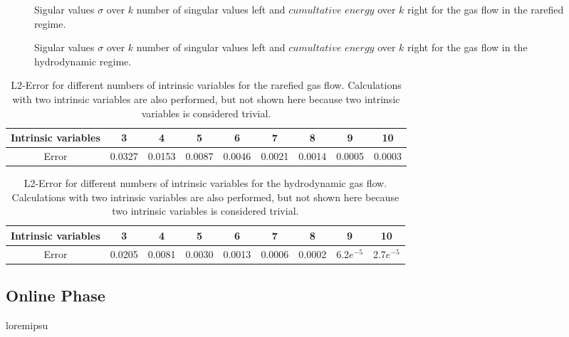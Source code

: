 \begin{figure}[!htbp]
	
	\caption{Sigular values \(\sigma\) over \(k\) number of singular values left and \(cumultative\) \(energy\) over \(k\) right for the gas flow in the rarefied regime.}
	\label{Fig:CumSum_Rare}
\end{figure}
\begin{figure}[!htbp]
	
	\caption{Sigular values \(\sigma\) over \(k\) number of singular values left and \(cumultative\) \(energy\) over \(k\) right for the gas flow in the hydrodynamic regime.}
	\label{Fig:CumSum_Hydro}
\end{figure}
\begin{table}[!htbp]\centering
\begin{tabular}{ |c|c|c|c|c|c|c|c|c| }
	\hline
	Intrinsic variables  & 3 & 4 & 5 & 6 & 7 & 8 & 9 & 10 \\ %
	\hline
	Error & 0.0327 & 0.0153 & 0.0087 & 0.0046 & 0.0021 & 0.0014 & 0.0005 & 0.0003\\ \hline
\end{tabular}
\caption{L2-Error for different numbers of intrinsic variables for the rarefied gas flow. Calculations with two intrinsic variables are also performed, but not shown here because two intrinsic variables is considered trivial.}
\label{Tab:Intrinsic units svd rare}
\end{table}
\begin{table}[!htbp]\centering
	\begin{tabular}{ |c|c|c|c|c|c|c|c|c| }
		\hline
		Intrinsic variables  & 3 & 4 & 5 & 6 & 7 & 8 & 9 & 10 \\ %
		\hline
		Error & 0.0205 & 0.0081 & 0.0030 & 0.0013 & 0.0006 & 0.0002 & 6.2\(e^{-5}\) & 2.7\(e^{-5}\)\\ \hline
	\end{tabular}
	\caption{L2-Error for different numbers of intrinsic variables for the hydrodynamic gas flow. Calculations with two intrinsic variables are also performed, but not shown here because two intrinsic variables is considered trivial.}
	\label{Tab:Intrinsic units svd hydro}
\end{table}
\textbf{}\subsection{Online Phase}
loremipsu
